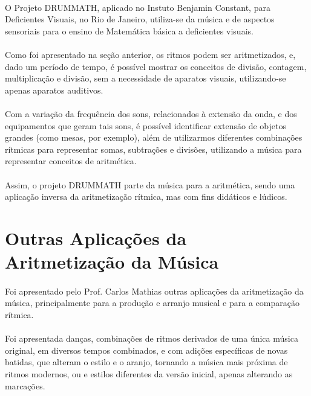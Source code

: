 \documentclass{article}
\begin{document}
	\paragraph{}
	O Projeto DRUMMATH, aplicado no Instuto Benjamin Constant, para Deficientes Visuais, no Rio de Janeiro, utiliza-se da música e de aspectos sensoriais para o ensino de Matemática básica a deficientes visuais.
	
	\paragraph{}
	Como foi apresentado na seção anterior, os ritmos podem ser aritmetizados, e, dado um período de tempo, é possível mostrar os conceitos de divisão, contagem, multiplicação e divisão, sem a necessidade de aparatos visuais, utilizando-se apenas aparatos auditivos.
	
	\paragraph{}
	Com a variação da frequência dos sons, relacionados à extensão da onda, e dos equipamentos que geram tais sons, é possível identificar extensão de objetos grandes (como mesas, por exemplo), além de utilizarmos diferentes combinações rítmicas para representar somas, subtrações e divisões, utilizando a música para representar conceitos de aritmética.
	
	\paragraph{}
	Assim, o projeto DRUMMATH parte da música para a aritmética, sendo uma aplicação inversa da aritmetização rítmica, mas com fins didáticos e lúdicos.
	
	\section{Outras Aplicações da Aritmetização da Música}
	
	\paragraph{}
	Foi apresentado pelo Prof. Carlos Mathias outras aplicações da aritmetização da música, principalmente para a produção e arranjo musical e para a comparação rítmica.
	
	\paragraph{}
	Foi apresentada danças, combinações de ritmos derivados de uma única música original, em diversos tempos combinados, e com adições específicas de novas batidas, que alteram o estilo e o aranjo, tornando a música mais próxima de ritmos modernos, ou e estilos diferentes da versão inicial, apenas alterando as marcações.
	
\end{document}
